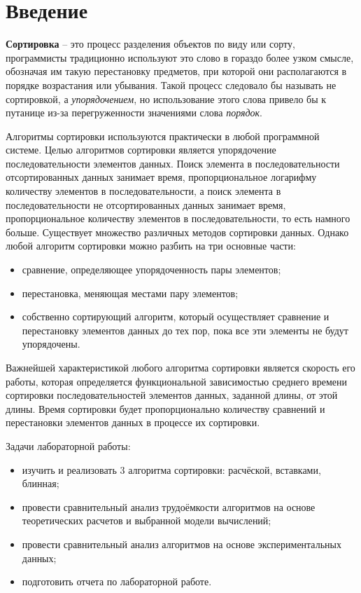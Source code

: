 \chapter*{Введение}
\textbf{Сортировка} -- это процесс разделения объектов по виду или сорту, программисты традиционно используют это слово в гораздо более узком смысле, обозначая им такую перестановку предметов, при которой они располагаются в порядке возрастания или убывания\cite{knut}.
Такой процесс следовало бы называть не сортировкой, а \textit{упорядочением}, но использование этого слова привело бы к путанице из-за перегруженности значениями слова \textit{порядок}.

Алгоритмы сортировки используются практически в любой программной системе.
Целью алгоритмов сортировки является упорядочение последовательности элементов данных.
Поиск элемента в последовательности отсортированных данных занимает время, пропорциональное логарифму количеству элементов в последовательности, а поиск элемента в последовательности не отсортированных данных занимает время, пропорциональное количеству элементов в последовательности, то есть намного больше.
Существует множество различных методов сортировки данных.
Однако любой алгоритм сортировки можно разбить на три основные части:
\begin{itemize}
    \item сравнение, определяющее упорядоченность пары элементов;
    \item перестановка, меняющая местами пару элементов;
    \item собственно сортирующий алгоритм, который осуществляет сравнение и перестановку элементов данных до тех пор, пока все эти элементы не будут упорядочены.
\end{itemize}

Важнейшей характеристикой любого алгоритма сортировки является скорость его работы, которая определяется функциональной зависимостью среднего времени сортировки последовательностей элементов данных, заданной длины, от этой длины. Время сортировки будет пропорционально количеству сравнений и перестановки элементов данных в процессе их сортировки.

\clearpage
Задачи лабораторной работы:
\begin{itemize}
	\item изучить и реализовать 3 алгоритма сортировки: расчёской, вставками, блинная;
	\item провести сравнительный анализ трудоёмкости алгоритмов на основе теоретических расчетов и выбранной модели вычислений;
	\item провести сравнительный анализ алгоритмов на основе экспериментальных данных;
    \item подготовить отчета по лабораторной работе.
\end{itemize}
